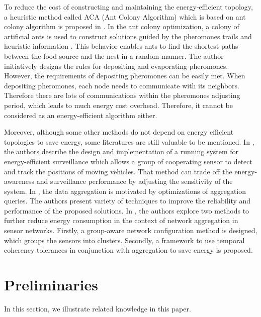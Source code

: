 \documentclass{elsarticle}
\begin{document}
To reduce the cost of constructing and maintaining the energy-efficient topology, a heuristic method called ACA (Ant Colony Algorithm) which is based on ant colony algorithm is proposed in \cite{label-10}. In the ant colony optimization, a colony of artificial ants is used to construct solutions guided by the pheromones trails and heuristic information \cite{label-11}. This behavior enables ants to find the shortest paths between the food source and the nest in a random manner. The author initiatively designs the rules for depositing and evaporating pheromones. However, the requirements of depositing pheromones can be easily met. When depositing pheromones, each node needs to communicate with its neighbors. Therefore there are lots of communications within the pheromones adjusting period, which leads to much energy cost overhead. Therefore, it cannot be considered as an energy-efficient algorithm either.

Moreover, although some other methods do not depend on energy efficient topologies to save energy, some literatures are still valuable to be mentioned. In \cite{label-30}, the authors describe the design and implementation of a running system for energy-efficient surveillance which allows a group of cooperating sensor to detect and track the positions of moving vehicles. That method can trade off the energy-awareness and surveillance performance by adjusting the sensitivity of the system. In \cite{label-29}, the data aggregation is motivated by optimizations of aggregation queries. The authors present variety of techniques to improve the reliability and performance of the proposed solutions. In \cite{label-31}, the authors explore two methods to further reduce energy consumption in the context of network aggregation in sensor networks. Firstly, a group-aware network configuration method is designed, which groups the sensors into clusters. Secondly, a framework to use temporal coherency tolerances in conjunction with aggregation to save energy is proposed.

\section{Preliminaries} \label{Preliminaries}
In this section, we illustrate related knowledge in this paper.
\end{document}
